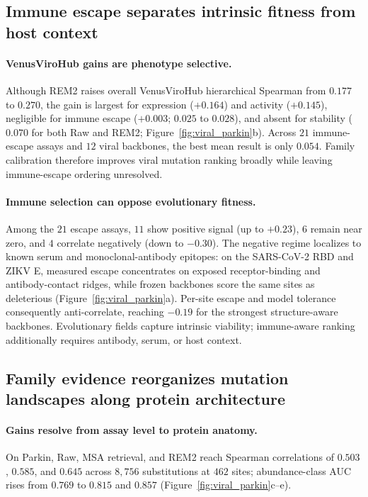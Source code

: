 \documentclass{article} %
\begin{document}
\subsection{Immune escape separates intrinsic fitness from host context}
\label{sec:immune_escape}

\paragraph{VenusViroHub gains are phenotype selective.}
Although \textsc{REM2} raises overall VenusViroHub hierarchical Spearman from $0.177$ to $0.270$, the gain is largest for expression ($+0.164$) and activity ($+0.145$), negligible for immune escape ($+0.003$; $0.025$ to $0.028$), and absent for stability ($0.070$ for both Raw and \textsc{REM2}; Figure~\ref{fig:viral_parkin}b). Across $21$ immune-escape assays and $12$ viral backbones, the best mean result is only $0.054$. Family calibration therefore improves viral mutation ranking broadly while leaving immune-escape ordering unresolved.

\paragraph{Immune selection can oppose evolutionary fitness.}
Among the $21$ escape assays, $11$ show positive signal (up to $+0.23$), $6$ remain near zero, and $4$ correlate negatively (down to $-0.30$). The negative regime localizes to known serum and monoclonal-antibody epitopes: on the SARS-CoV-2 RBD and ZIKV E, measured escape concentrates on exposed receptor-binding and antibody-contact ridges, while frozen backbones score the same sites as deleterious (Figure~\ref{fig:viral_parkin}a). Per-site escape and model tolerance consequently anti-correlate, reaching $-0.19$ for the strongest structure-aware backbones. Evolutionary fields capture intrinsic viability; immune-aware ranking additionally requires antibody, serum, or host context.

\subsection{Family evidence reorganizes mutation landscapes along protein architecture}
\label{sec:parkin_case}

\paragraph{Gains resolve from assay level to protein anatomy.}
On Parkin, Raw, MSA retrieval, and \textsc{REM2} reach Spearman correlations of $0.503$, $0.585$, and $0.645$ across $8{,}756$ substitutions at $462$ sites; abundance-class AUC rises from $0.769$ to $0.815$ and $0.857$ (Figure~\ref{fig:viral_parkin}c--e).
\end{document}
